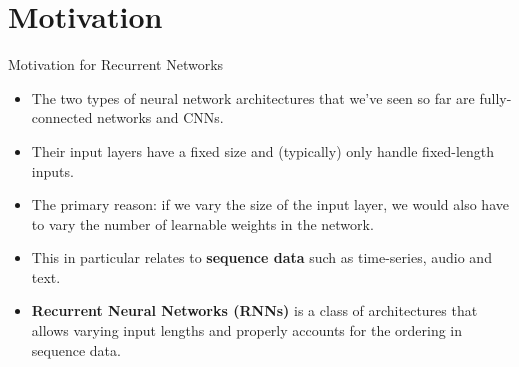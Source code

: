 \documentclass[11pt,compress,t,notes=noshow, xcolor=table]{beamer}
\begin{document}

\section{Motivation}

\begin{frame} {Motivation for Recurrent Networks}
  \begin{itemize}
    \item The two types of neural network architectures that we've seen so far are fully-connected networks and CNNs.
    \item Their input layers have a fixed size and (typically) only handle fixed-length inputs.
    \item The primary reason: if we vary the size of the input layer, we would also have to vary the number of learnable weights in the network.
    \item This in particular relates to \textbf{sequence data} such as time-series, audio and text.
    \item \textbf{Recurrent Neural Networks (RNNs)} is a class of architectures that allows varying input lengths and properly accounts for the ordering in sequence data.
  \end{itemize}
\end{frame}



 
\end{document}

